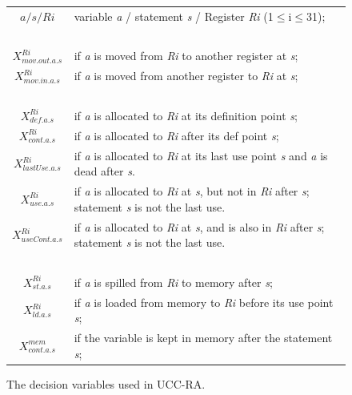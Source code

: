 \begin{figure}[htbp]
\begin{tabular}{c|p{5.0in}} 
$a / s / Ri$  & variable {\it a} / statement {\it s} / Register {\it Ri} (1$\le$i$\le$31); \\
~\\

$X_{mov.out.a.s}^{Ri}$ & if {\it a} is moved from {\it Ri}
to another register at {\it s}; \\

$X_{mov.in.a.s}^{Ri}$ & if {\it a} is moved from another
register to {\it Ri} at {\it s}; \\

~ \\

$X_{def.a.s}^{Ri}$ & if {\it a} is allocated to {\it Ri} at its
definition point {\it s};\\

$X_{cont.a.s}^{Ri}$ & if {\it a} is allocated to {\it Ri} after its
def point {\it s}; \\

$X_{lastUse.a.s}^{Ri}$ & if {\it a} is allocated to {\it Ri} at its
last use point {\it s} and {\it a} is dead after {\it s}. \\

$X_{use.a.s}^{Ri}$ & if {\it a} is allocated to {\it Ri} at {\it s},
but not in {\it Ri} after {\it s}; statement {\it s} is not the last
use.\\

$X_{useCont.a.s}^{Ri}$ & if {\it a} is allocated to {\it Ri} at {\it
s}, and is also in {\it Ri} after {\it s}; statement {\it s} is not
the last use.\\

~ \\

$X_{st.a.s}^{Ri}$ & if {\it a} is spilled from {\it Ri} to memory
after {\it s};\\

$X_{ld.a.s}^{Ri}$ & if {\it a} is loaded from memory to {\it Ri}
before its use point {\it s}; \\

$X_{cont.a.s}^{mem}$ & if the variable is kept in memory after the
statement {\it s};
\end{tabular}
\caption{The decision variables used in UCC-RA.}
\label{decisionvars}
\end{figure}

